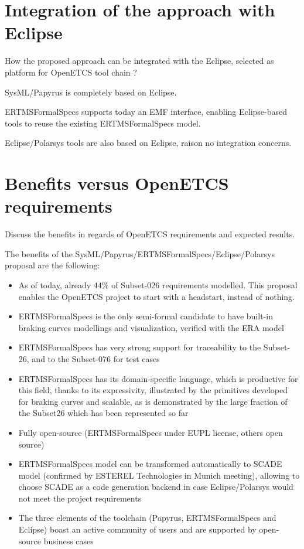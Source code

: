 \section{Integration of the approach with Eclipse}

\begin{todo_comment}
How the proposed approach can be integrated with the Eclipse, selected as platform for OpenETCS tool chain ?
\end{todo_comment}

SysML/Papyrus is completely based on Eclipse.

ERTMSFormalSpecs supports today an EMF interface, enabling Eclipse-based tools to reuse the existing ERTMSFormalSpecs model. 

Eclipse/Polarsys tools are also based on Eclipse, raison no integration concerns.

\section{Benefits versus OpenETCS requirements}

\begin{todo_comment}
Discuss the benefits in regards of OpenETCS requirements and expected results.
\end{todo_comment}

The benefits of the SysML/Papyrus/ERTMSFormalSpecs/Eclipse/Polarsys proposal are the following:

\begin{itemize}
	\item As of today, already 44\% of Subset-026 requirements modelled. This proposal enables the OpenETCS project to start with a headstart, instead of nothing.
	\item ERTMSFormalSpecs is the only semi-formal candidate to have built-in braking curves modellings and visualization, verified with the ERA model
	\item ERTMSFormalSpecs has very strong support for traceability to the Subset-26, and to the Subset-076 for test cases
	\item ERTMSFormalSpecs has its domain-specific language, which is productive for this field, thanks to its expressivity, illustrated by the primitives
developed for braking curves and scalable, as is demonstrated by the large fraction of the Subset26 which has been represented so far
	\item Fully open-source (ERTMSFormalSpecs under EUPL license, others open source)
	\item ERTMSFormalSpecs model can be transformed automatically to SCADE model (confirmed by ESTEREL Technologies in Munich meeting), allowing to choose SCADE as a code generation backend in case Eclipse/Polarsys would not meet the project requirements
	\item The three elements of the toolchain (Papyrus, ERTMSFormalSpecs and Eclipse) boast an active community of users and are supported by open-source business cases
\end{itemize}


